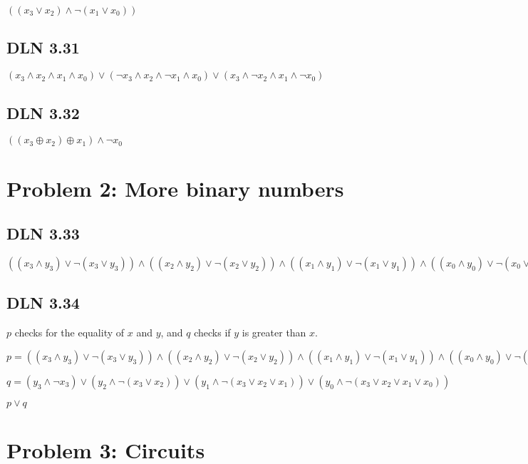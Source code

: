 \documentclass[titlepage]{article}
\begin{document}
\(((x_3\lor x_2)\land \lnot(x_1\lor x_0))\)

\subsection{DLN 3.31} 

\( (x_3 \land x_2 \land x_1 \land x_0) \lor (\lnot x_3 \land x_2 \land \lnot x_1 \land x_0) \lor (x_3 \land \lnot x_2 \land x_1 \land \lnot x_0)      \)

\subsection{DLN 3.32} 

\( ((x_3 \oplus x_2) \oplus x_1) \land \lnot x_0  \)


\section{Problem 2: More binary numbers}

\subsection{DLN 3.33} 

\( ((x_3 \land y_3) \lor \lnot(x_3 \lor y_3)) \land ((x_2 \land y_2) \lor \lnot(x_2 \lor y_2)) \land ((x_1 \land y_1) \lor \lnot(x_1\lor y_1)) \land ((x_0 \land y_0) \lor \lnot(x_0 \lor y_0))    \)

\subsection{DLN 3.34} 

$p$ checks for the equality of $x$ and $y$, and $q$ checks if $y$ is greater than $x$.

\( p = ((x_3 \land y_3) \lor \lnot(x_3 \lor y_3)) \land ((x_2 \land y_2) \lor \lnot(x_2 \lor y_2)) \land ((x_1 \land y_1) \lor \lnot(x_1\lor y_1)) \land ((x_0 \land y_0) \lor \lnot(x_0 \lor y_0))    \)

\( q = (y_3 \land \lnot x_3) \lor (y_2 \land \lnot(x_3 \lor x_2)) \lor (y_1 \land \lnot(x_3 \lor x_2 \lor x_1)) \lor (y_0 \land \lnot(x_3 \lor x_2 \lor x_1 \lor x_0))    \)

\( p \lor q \)

\section{Problem 3: Circuits}
\end{document}
